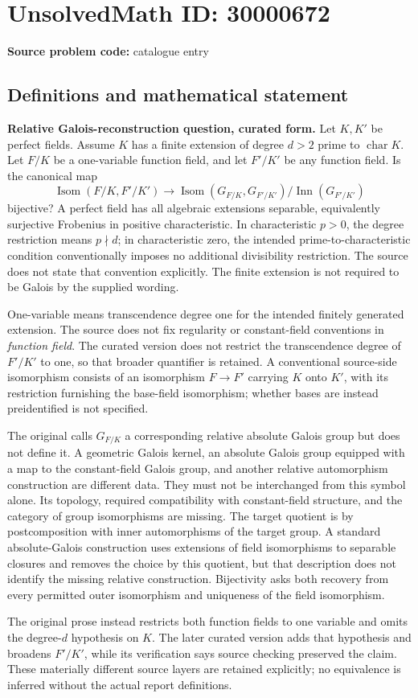 \documentclass[11pt]{article}
\begin{document}
\section*{UnsolvedMath ID: 30000672}
\textbf{Source problem code:} catalogue entry
\subsection{Definitions and mathematical statement}
\textbf{Relative Galois-reconstruction question, curated form.} Let \(K,K'\) be perfect fields. Assume \(K\) has a finite extension of degree \(d>2\) prime to \(\operatorname{char}K\). Let \(F/K\) be a one-variable function field, and let \(F'/K'\) be any function field. Is the canonical map\[\operatorname{Isom}(F/K,F'/K')\longrightarrow\operatorname{Isom}(G_{F/K},G_{F'/K'})/\operatorname{Inn}(G_{F'/K'})\] bijective? A perfect field has all algebraic extensions separable, equivalently surjective Frobenius in positive characteristic. In characteristic \(p>0\), the degree restriction means \(p\nmid d\); in characteristic zero, the intended prime-to-characteristic condition conventionally imposes no additional divisibility restriction. The source does not state that convention explicitly. The finite extension is not required to be Galois by the supplied wording.\par One-variable means transcendence degree one for the intended finitely generated extension. The source does not fix regularity or constant-field conventions in \emph{function field}. The curated version does not restrict the transcendence degree of \(F'/K'\) to one, so that broader quantifier is retained. A conventional source-side isomorphism consists of an isomorphism \(F\to F'\) carrying \(K\) onto \(K'\), with its restriction furnishing the base-field isomorphism; whether bases are instead preidentified is not specified.\par The original calls \(G_{F/K}\) a corresponding relative absolute Galois group but does not define it. A geometric Galois kernel, an absolute Galois group equipped with a map to the constant-field Galois group, and another relative automorphism construction are different data. They must not be interchanged from this symbol alone. Its topology, required compatibility with constant-field structure, and the category of group isomorphisms are missing. The target quotient is by postcomposition with inner automorphisms of the target group. A standard absolute-Galois construction uses extensions of field isomorphisms to separable closures and removes the choice by this quotient, but that description does not identify the missing relative construction. Bijectivity asks both recovery from every permitted outer isomorphism and uniqueness of the field isomorphism.\par The original prose instead restricts both function fields to one variable and omits the degree-\(d\) hypothesis on \(K\). The later curated version adds that hypothesis and broadens \(F'/K'\), while its verification says source checking preserved the claim. These materially different source layers are retained explicitly; no equivalence is inferred without the actual report definitions.\par 
\end{document}
